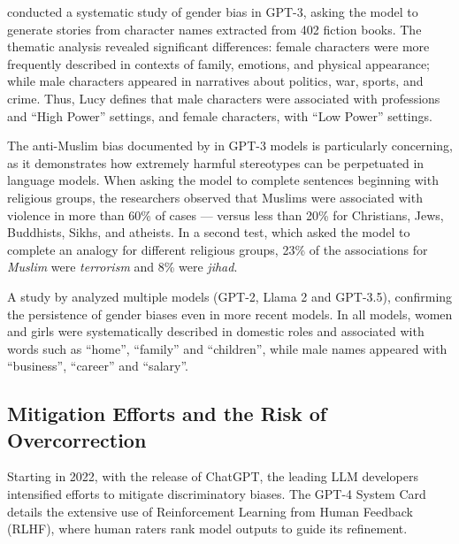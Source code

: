 \documentclass[12pt,a4paper]{article}
\begin{document}
\citet{lucy2021} conducted a systematic study of gender bias
in GPT-3, asking the model to generate stories from character names
extracted from 402 fiction books. The thematic analysis
revealed significant differences: female characters were more
frequently described in contexts of family, emotions, and physical
appearance; while male characters appeared in narratives about
politics, war, sports, and crime.
Thus, Lucy defines that male characters
were associated with professions and ``High Power'' settings, and
female characters, with ``Low Power'' settings.

The anti-Muslim bias documented by \citet{abid2021} in
GPT-3 models is particularly concerning, as it demonstrates how
extremely harmful stereotypes can be perpetuated in language models. When
asking the model to complete sentences beginning with religious
groups, the researchers observed that Muslims were associated with
violence in more than 60\% of cases --- versus less than 20\% for
Christians, Jews, Buddhists, Sikhs, and atheists. In a second test, which
asked the model to complete an analogy for different
religious groups, 23\% of the associations for \textit{Muslim} were \textit{terrorism} and 8\% were
\textit{jihad}.

A study by \citet{unesco2024} analyzed multiple models (GPT-2, Llama 2 and
GPT-3.5), confirming the persistence of gender biases even in
more recent models. In all models, women and girls were
systematically described in domestic roles and associated with words
such as ``home'', ``family'' and ``children'', while male names
appeared with ``business'', ``career'' and ``salary''.


\subsection{Mitigation Efforts and the Risk of Overcorrection}


Starting in 2022, with the release of ChatGPT, the leading
LLM developers intensified efforts to mitigate discriminatory
biases. The GPT-4 System Card \citep{openai2023} details the
extensive use of Reinforcement Learning from Human Feedback (RLHF), where
human raters rank model outputs to guide its
refinement.
\end{document}
